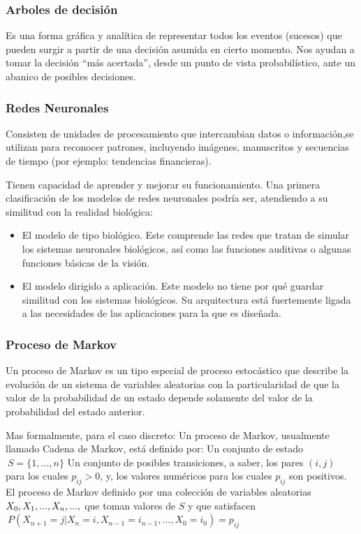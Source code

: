 \documentclass[a4paper]{article}
\begin{document}
\subsubsection*{Arboles de decisión}
Es una forma gráfica y analítica de representar todos los eventos (sucesos) que
pueden surgir a partir de una decisión asumida en cierto momento. Nos ayudan a tomar la decisión “más acertada”, desde un punto de vista probabilístico, ante un
abanico de posibles decisiones.

\subsubsection*{Redes Neuronales}
Consisten de unidades de procesamiento que intercambian datos o
información,se utilizan para reconocer patrones, incluyendo imágenes, manuscritos y
secuencias de tiempo (por ejemplo: tendencias financieras).

Tienen capacidad de aprender y mejorar su funcionamiento. Una primera clasificación de los modelos de redes neuronales podría ser,
atendiendo a su similitud con la realidad biológica:
\begin{itemize}
\item El modelo de tipo biológico. Este comprende las redes que tratan de simular los sistemas neuronales biológicos, así como las funciones auditivas o algunas funciones básicas de la visión.
\item El modelo dirigido a aplicación. Este modelo no tiene por qué guardar similitud con los sistemas biológicos. Su arquitectura está fuertemente ligada a las necesidades de las aplicaciones para la que es diseñada.

\end{itemize}

\subsubsection{Proceso de Markov}
Un proceso de Markov es un tipo especial de proceso estocástico que describe la evolución de un sistema de variables aleatorias con la particularidad de que la valor de la probabilidad de un estado depende solamente del valor de la probabilidad del estado anterior.

Mas formalmente, para el caso discreto:
Un proceso de Markov, usualmente llamado Cadena de Markov, está definido por:
Un conjunto de estado $\ S = \{1,..., n\}$
Un conjunto de posibles transiciones, a saber, los pares $(i, j)$ para los cuales $p_{ij} > 0$, y, los valores numéricos para los cuales $p_{ij}$ son positivos.\\
El proceso de Markov definido por una colección de variables aleatorias $X_{0},\\
X_{1},...,X_{n},...,$ que toman valores de $S$ y que satisfacen $\ P(X_{n+1} = j | X_{n} = i, X_{n-1} = i_{n-1},..., X_{0} = i_{0}) = p_{ij}$
\end{document}
